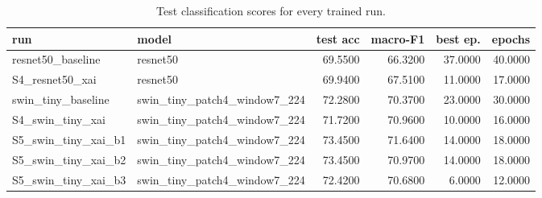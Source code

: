 \begin{table}[t]
\centering
\caption{Test classification scores for every trained run.}
\label{tab:cls}
\begin{tabular}{llrrrr}
\toprule
run & model & test acc & macro-F1 & best ep. & epochs \\
\midrule
resnet50_baseline & resnet50 & 69.5500 & 66.3200 & 37.0000 & 40.0000 \\
S4_resnet50_xai & resnet50 & 69.9400 & 67.5100 & 11.0000 & 17.0000 \\
swin_tiny_baseline & swin_tiny_patch4_window7_224 & 72.2800 & 70.3700 & 23.0000 & 30.0000 \\
S4_swin_tiny_xai & swin_tiny_patch4_window7_224 & 71.7200 & 70.9600 & 10.0000 & 16.0000 \\
S5_swin_tiny_xai_b1 & swin_tiny_patch4_window7_224 & 73.4500 & 71.6400 & 14.0000 & 18.0000 \\
S5_swin_tiny_xai_b2 & swin_tiny_patch4_window7_224 & 73.4500 & 70.9700 & 14.0000 & 18.0000 \\
S5_swin_tiny_xai_b3 & swin_tiny_patch4_window7_224 & 72.4200 & 70.6800 & 6.0000 & 12.0000 \\
\bottomrule
\end{tabular}
\end{table}
